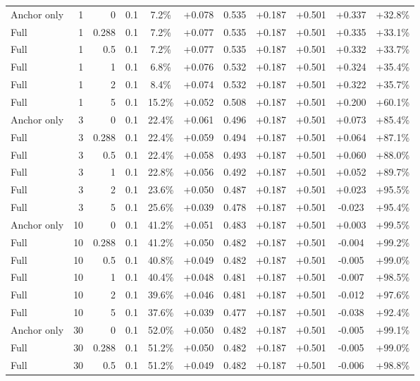 \begin{table}[htbp]
\begin{tabular}{lrrrccccccc}
Anchor only & 1 & 0 & 0.1 & 7.2\% & +0.078 & 0.535 & +0.187 & +0.501 & +0.337 & +32.8\% \\
Full & 1 & 0.288 & 0.1 & 7.2\% & +0.077 & 0.535 & +0.187 & +0.501 & +0.335 & +33.1\% \\
Full & 1 & 0.5 & 0.1 & 7.2\% & +0.077 & 0.535 & +0.187 & +0.501 & +0.332 & +33.7\% \\
Full & 1 & 1 & 0.1 & 6.8\% & +0.076 & 0.532 & +0.187 & +0.501 & +0.324 & +35.4\% \\
Full & 1 & 2 & 0.1 & 8.4\% & +0.074 & 0.532 & +0.187 & +0.501 & +0.322 & +35.7\% \\
Full & 1 & 5 & 0.1 & 15.2\% & +0.052 & 0.508 & +0.187 & +0.501 & +0.200 & +60.1\% \\
Anchor only & 3 & 0 & 0.1 & 22.4\% & +0.061 & 0.496 & +0.187 & +0.501 & +0.073 & +85.4\% \\
Full & 3 & 0.288 & 0.1 & 22.4\% & +0.059 & 0.494 & +0.187 & +0.501 & +0.064 & +87.1\% \\
Full & 3 & 0.5 & 0.1 & 22.4\% & +0.058 & 0.493 & +0.187 & +0.501 & +0.060 & +88.0\% \\
Full & 3 & 1 & 0.1 & 22.8\% & +0.056 & 0.492 & +0.187 & +0.501 & +0.052 & +89.7\% \\
Full & 3 & 2 & 0.1 & 23.6\% & +0.050 & 0.487 & +0.187 & +0.501 & +0.023 & +95.5\% \\
Full & 3 & 5 & 0.1 & 25.6\% & +0.039 & 0.478 & +0.187 & +0.501 & -0.023 & +95.4\% \\
Anchor only & 10 & 0 & 0.1 & 41.2\% & +0.051 & 0.483 & +0.187 & +0.501 & +0.003 & +99.5\% \\
Full & 10 & 0.288 & 0.1 & 41.2\% & +0.050 & 0.482 & +0.187 & +0.501 & -0.004 & +99.2\% \\
Full & 10 & 0.5 & 0.1 & 40.8\% & +0.049 & 0.482 & +0.187 & +0.501 & -0.005 & +99.0\% \\
Full & 10 & 1 & 0.1 & 40.4\% & +0.048 & 0.481 & +0.187 & +0.501 & -0.007 & +98.5\% \\
Full & 10 & 2 & 0.1 & 39.6\% & +0.046 & 0.481 & +0.187 & +0.501 & -0.012 & +97.6\% \\
Full & 10 & 5 & 0.1 & 37.6\% & +0.039 & 0.477 & +0.187 & +0.501 & -0.038 & +92.4\% \\
Anchor only & 30 & 0 & 0.1 & 52.0\% & +0.050 & 0.482 & +0.187 & +0.501 & -0.005 & +99.1\% \\
Full & 30 & 0.288 & 0.1 & 51.2\% & +0.050 & 0.482 & +0.187 & +0.501 & -0.005 & +99.0\% \\
Full & 30 & 0.5 & 0.1 & 51.2\% & +0.049 & 0.482 & +0.187 & +0.501 & -0.006 & +98.8\% \\

\end{tabular}
\end{table}
